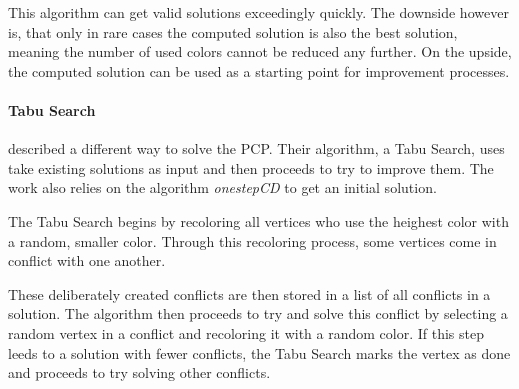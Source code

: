 \documentclass[paper=a4,fontsize=12pt]{scrartcl}
\begin{document}
This algorithm can get valid solutions exceedingly quickly. The downside however is, that only in rare cases the computed solution is also the best solution, meaning the number of used colors cannot be reduced any further. On the upside, the computed solution can be used as a starting point for improvement processes.

 
\paragraph{Tabu Search}{
\citet*{Noronha2006} described a different way to solve the PCP. Their algorithm, a Tabu Search, uses take existing solutions as input and then proceeds to try to improve them. The work also relies on the algorithm \emph{onestepCD} to get an initial solution.


The Tabu Search begins by recoloring all vertices who use the heighest color with a random, smaller color. Through this recoloring process, some vertices come in conflict with one another. 


These deliberately created conflicts are then stored in a list of all conflicts in a solution. The algorithm then proceeds to try and solve this conflict by selecting a random vertex in a conflict and recoloring it with a random color. If this step leeds to a solution with fewer conflicts, the Tabu Search marks the vertex as done and proceeds to try solving other conflicts.


}
\end{document}
